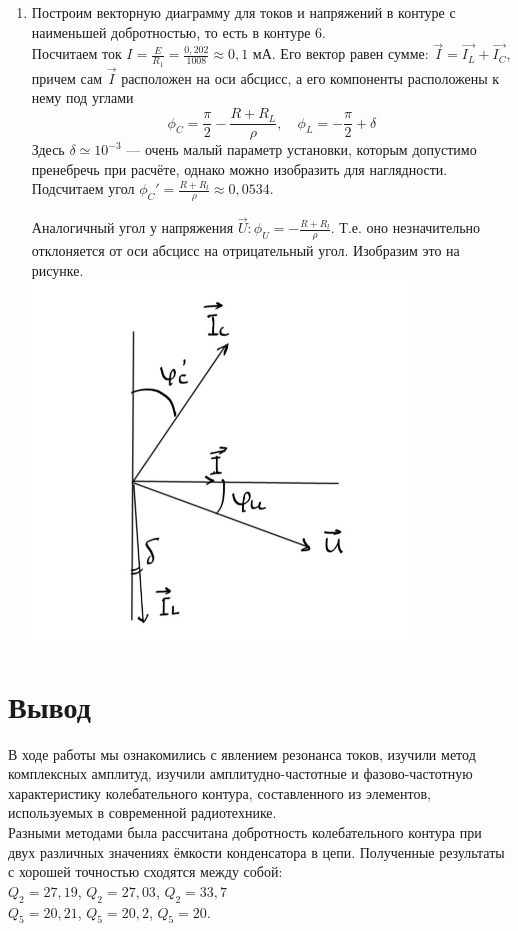 \documentclass[11pt]{article}
\begin{document}
\begin{enumerate}
 \\
\item Построим векторную диаграмму для токов и напряжений в контуре с наименьшей добротностью, то есть в контуре 6.\\
Посчитаем ток $ I = \frac{E}{R_1} = \frac{0,202}{1008} \approx 0,1$ мА. Его вектор равен сумме: $ \vec{I} = \vec{I_L} + \vec{I_C} $, причем сам $ \vec{I} $ расположен на оси абсцисс, а его компоненты расположены к нему под углами
\begin{equation}\label{}
\phi_C = \frac{\pi}{2} - \frac{R + R_L}{\rho}, \quad \phi_L = -\frac{\pi}{2} + \delta
\end{equation}
Здесь $ \delta \simeq 10^{-3}$ --- очень малый параметр установки, которым допустимо пренебречь при расчёте, однако можно изобразить для наглядности. Подсчитаем угол $ \phi_C' =   \frac{R + R_l}{\rho} \approx 0,0534 $. 

Аналогичный угол у напряжения $ \vec{U}: \phi_U = - \frac{R + R_l}{\rho} $. Т.е. оно незначительно отклоняется от оси абсцисс на отрицательный угол.
Изобразим это на рисунке. \\
\includegraphics[width=10cm]{g7}\\
\end{enumerate}

\section{Вывод}
В ходе работы мы ознакомились с явлением резонанса токов, изучили метод комплексных амплитуд, изучили амплитудно-частотные и фазово-частотную характеристику колебательного контура, составленного из элементов, используемых в современной радиотехнике.\\
Разными методами была рассчитана добротность колебательного контура при двух различных значениях ёмкости конденсатора в цепи. Полученные результаты с хорошей точностью сходятся между собой:\\
$Q_{2} = 27,19$, $Q_2 = 27,03$, $Q_2 = 33,7$\\
$Q_5 = 20,21$, $Q_5 = 20,2$, $Q_5 = 20$.\\
\end{document}
